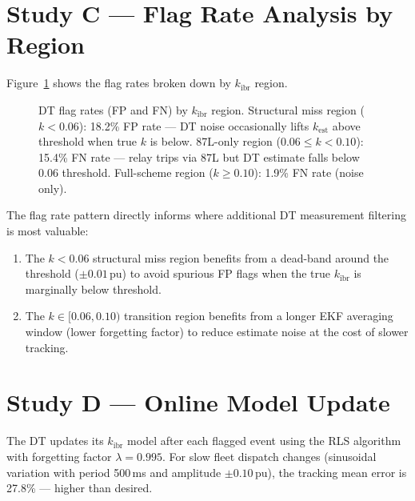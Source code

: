 \documentclass[11pt,a4paper]{article}
\begin{document}
\section{Study C --- Flag Rate Analysis by Region}
\label{sec:studyC}

Figure~\ref{fig:flags} shows the flag rates broken down by $k_\mathrm{ibr}$ region.

\begin{figure}[htbp]
  \centering
  \resizebox{0.88\textwidth}{!}{}
  \caption{DT flag rates (FP and FN) by $k_\mathrm{ibr}$ region.
           Structural miss region ($k<0.06$): 18.2\% FP rate --- DT noise
           occasionally lifts $k_\mathrm{est}$ above threshold when true $k$
           is below.  87L-only region ($0.06\leq k<0.10$): 15.4\% FN rate
           --- relay trips via 87L but DT estimate falls below 0.06 threshold.
           Full-scheme region ($k\geq0.10$): 1.9\% FN rate (noise only).}
  \label{fig:flags}
\end{figure}

\noindent
The flag rate pattern directly informs where additional DT measurement filtering
is most valuable:
\begin{enumerate}
  \item The $k<0.06$ structural miss region benefits from a dead-band around the
    threshold ($\pm0.01$\,pu) to avoid spurious FP flags when the true
    $k_\mathrm{ibr}$ is marginally below threshold.

  \item The $k\in[0.06,0.10)$ transition region benefits from a longer
    EKF averaging window (lower forgetting factor) to reduce estimate noise
    at the cost of slower tracking.
\end{enumerate}

\section{Study D --- Online Model Update}
\label{sec:studyD}

The DT updates its $k_\mathrm{ibr}$ model after each flagged event using
the RLS algorithm with forgetting factor $\lambda=0.995$.  For slow fleet
dispatch changes (sinusoidal variation with period 500\,ms and amplitude
$\pm0.10$\,pu), the tracking mean error is 27.8\% --- higher than desired.
\end{document}
